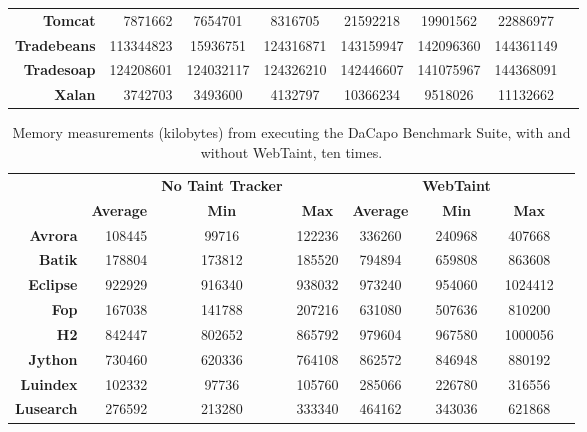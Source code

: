 \begin{sidewaystable}
\begin{tabular}{rrcccccc}
    \textbf{Tomcat}     & 7871662          & 7654701      & 8316705      & 21592218         & 19901562     & 22886977     \\
    \textbf{Tradebeans} & 113344823        & 15936751     & 124316871    & 143159947        & 142096360    & 144361149    \\
    \textbf{Tradesoap}  & 124208601        & 124032117    & 124326210    & 142446607        & 141075967    & 144368091    \\
    \textbf{Xalan}      & 3742703          & 3493600      & 4132797      & 10366234         & 9518026      & 11132662    
  \end{tabular}
\end{sidewaystable}

\begin{sidewaystable}
  \centering
  \caption{Memory measurements (kilobytes) from executing the DaCapo Benchmark Suite, with and without WebTaint, ten times.}
  \label{MemoryTable}
  \begin{tabular}{rrcccccc}
    & & \textbf{No Taint Tracker} & & & \textbf{WebTaint} & \\
    & \textbf{Average} & \textbf{Min} & \textbf{Max} & \textbf{Average} & \textbf{Min} & \textbf{Max} \\
    \textbf{Avrora}     & 108445           & 99716        & 122236       & 336260           & 240968       & 407668       \\
    \textbf{Batik}      & 178804           & 173812       & 185520       & 794894           & 659808       & 863608       \\
    \textbf{Eclipse}    & 922929           & 916340       & 938032       & 973240           & 954060       & 1024412      \\
    \textbf{Fop}        & 167038           & 141788       & 207216       & 631080           & 507636       & 810200       \\
    \textbf{H2}         & 842447           & 802652       & 865792       & 979604           & 967580       & 1000056      \\
    \textbf{Jython}     & 730460           & 620336       & 764108       & 862572           & 846948       & 880192       \\
    \textbf{Luindex}    & 102332           & 97736        & 105760       & 285066           & 226780       & 316556       \\
    \textbf{Lusearch}   & 276592           & 213280       & 333340       & 464162           & 343036       & 621868       \\

\end{tabular}
\end{sidewaystable}
